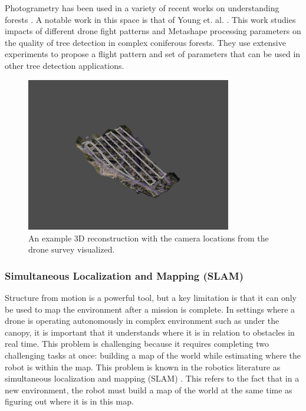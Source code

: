Photogrametry has been used in a variety of recent works on understanding forests \cite{Swayze2021InfluenceDensity, doi:10.1139/cjfr-2020-0433}. A notable work in this space is that of Young et. al. \cite{Young2022}. This work studies impacts of different drone fight patterns and Metashape processing parameters on the quality of tree detection in complex coniferous forests. They use extensive experiments to propose a flight pattern and set of parameters that can be used in other tree detection applications.
\begin{figure}
    \centering
    \includegraphics[width=0.8\textwidth, trim={4cm 3cm 4cm 4cm}, clip]{figs/methods/structure_from_motion/camera estimation.png}
    \caption{An example 3D reconstruction with the camera locations from the drone survey visualized.}
    \label{fig:background:camera_locations}
\end{figure}


\subsubsection{Simultaneous Localization and Mapping (SLAM)}
Structure from motion is a powerful tool, but a key limitation is that it can only be used to map the environment after a mission is complete. In settings where a drone is operating autonomously in complex environment such as under the canopy, it is important that it understands where it is in relation to obstacles in real time. This problem is challenging because it requires completing two challenging tasks at once: building a map of the world while estimating where the robot is within the map. This problem is known in the robotics literature as simultaneous localization and mapping (SLAM) \cite{durrant2006simultaneous}. This refers to the fact that in a new environment, the robot must build a map of the world at the same time as figuring out where it is in this map. 

